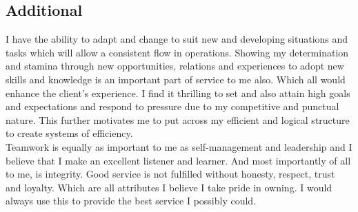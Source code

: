 \documentclass[a4, 10pt]{article}
\begin{document}
{\subsection{Additional}

I have the ability to adapt and change to suit new and developing situations and tasks which will allow a consistent flow in operations. Showing my determination and stamina through new opportunities, relations and experiences to adopt new skills and knowledge is an important part of service to me also. Which all would enhance the client’s experience. I find it thrilling to set and also attain high goals and expectations and respond to pressure due to my competitive and punctual nature. This further motivates me to put across my efficient and logical structure to create systems of efficiency.\\

Teamwork is equally as important to me as self-management and leadership and I believe that I make an excellent listener and learner. And most importantly of all to me, is integrity. Good service is not fulfilled without honesty, respect, trust and loyalty. Which are all attributes I believe I take pride in owning. I would always use this to provide the best service I possibly could.

}
\end{document}

